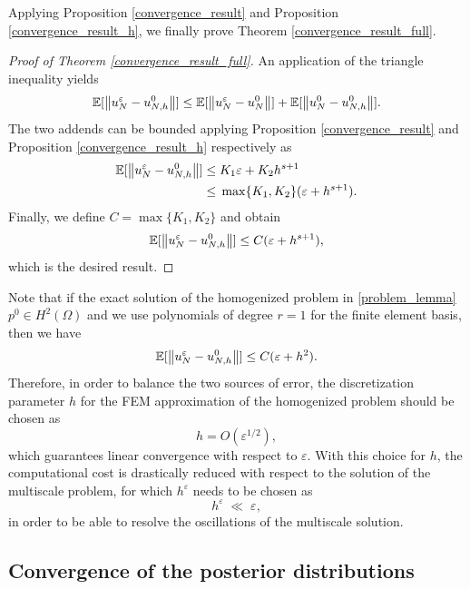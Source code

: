 \documentclass[10pt]{article}
\begin{document}
Applying Proposition \ref{convergence_result} and Proposition \ref{convergence_result_h}, we finally prove Theorem \ref{convergence_result_full}.
\begin{proof}[Proof of Theorem \ref{convergence_result_full}]
An application of the triangle inequality yields
\[ \mathbb{E}[ \left\|u_N^{\varepsilon} - u_{N,h}^0\right\| ] \le \mathbb{E} [ \left\|u_N^{\varepsilon} - u_N^0\right\| ] + \mathbb{E} [ \left\|u_N^0 - u_{N,h}^0\right\| ]. \]
The two addends can be bounded applying Proposition \ref{convergence_result} and Proposition \ref{convergence_result_h} respectively as
\begin{align*}
\mathbb{E}[ \left\|u_N^{\varepsilon} - u_{N,h}^0\right\| ] \le & \; K_1 \varepsilon + K_2 h^{s+1} \\
\le & \; \max \{ K_1, K_2 \} (\varepsilon + h^{s+1}).
\end{align*}
Finally, we define $C = \max \{ K_1, K_2 \}$ and obtain
\begin{equation*}
\mathbb{E}[ \left\|u_N^{\varepsilon} - u_{N,h}^0\right\| ] \le C (\varepsilon + h^{s+1}),
\end{equation*}
which is the desired result.
\end{proof}

\begin{remark}
Note that if the exact solution of the homogenized problem in \eqref{problem_lemma} $p^0 \in H^{2}(\Omega)$ and we use polynomials of degree $r = 1$ for the finite element basis, then we have
\begin{equation*}
\mathbb{E}[ \left\|u_N^{\varepsilon} - u_{N,h}^0\right\| ] \le C (\varepsilon + h^2).
\end{equation*}
Therefore, in order to balance the two sources of error, the discretization parameter $h$ for the FEM approximation of the homogenized problem should be chosen as
\begin{equation}
\label{heremark}
h = O( \varepsilon^{1/2} ),
\end{equation}
which guarantees linear convergence with respect to $\varepsilon$. With this choice for $h$, the computational cost is drastically reduced with respect to the solution of the multiscale problem, for which $h^{\varepsilon}$ needs to be chosen as
\[ h^{\varepsilon} \; \ll \; \varepsilon, \]
in order to be able to resolve the oscillations of the multiscale solution.
\end{remark}

\subsection{Convergence of the posterior distributions}
\end{document}
